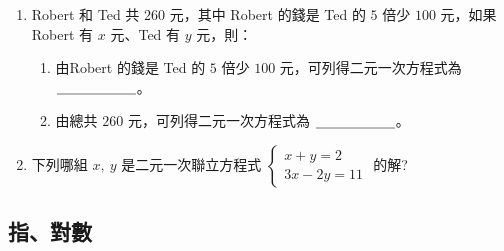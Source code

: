 \documentclass[bwprint,a4paper]{extarticle}
\begin{document}
\vspace{15ex}
\begin{observing}
	\begin{enumerate}
		\item Robert 和 Ted 共 $260$ 元，其中 Robert 的錢是 Ted 的 $5$ 倍少 $100$ 元，如果 Robert 有 $x$ 元、Ted 有 $y$ 元，則：
		\begin{enumerate}
			\item 由Robert 的錢是 Ted 的 $5$ 倍少 $100$ 元，可列得二元一次方程式為 $\underline{\hbox to 20mm{}}$。
			\item 由總共 $260$ 元，可列得二元一次方程式為 $\underline{\hbox to 20mm{}}$。
		\end{enumerate}
		\item 下列哪組 $x,\ y$ 是二元一次聯立方程式
		$\begin{cases}
			x+y=2\\[8pt]
			3x-2y=11
		\end{cases}$ 的解?\\[12pt]
	\end{enumerate}
\end{observing}

\newpage

\begin{center}
	\section{指、對數}
\end{center}
\end{document}
